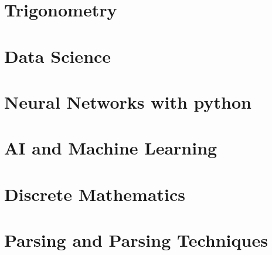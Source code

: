\documentclass[a4paper,12pt]{book}
\begin{document}
\chapter{Trigonometry}


\chapter{Data Science}

\chapter{Neural Networks with python}

\chapter{AI and Machine Learning}

\chapter{Discrete Mathematics}


\chapter{Parsing and Parsing Techniques}
\end{document}
